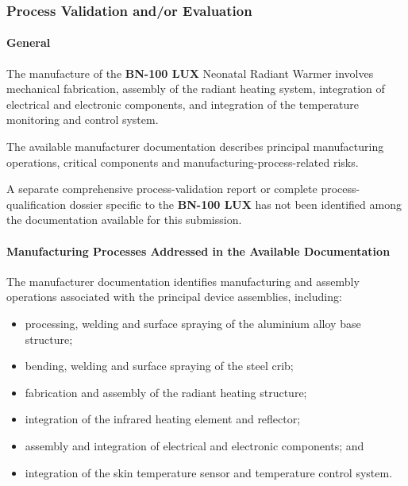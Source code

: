 ﻿

\hypertarget{p3-3-2-5}{}

\subsubsection{Process Validation and/or Evaluation}

\paragraph{General}

The manufacture of the \textbf{BN-100 LUX} Neonatal Radiant Warmer
involves mechanical fabrication, assembly of the radiant heating
system, integration of electrical and electronic components, and
integration of the temperature monitoring and control system.

The available manufacturer documentation describes principal
manufacturing operations, critical components and
manufacturing-process-related risks.

A separate comprehensive process-validation report or complete
process-qualification dossier specific to the \textbf{BN-100 LUX}
has not been identified among the documentation available for this
submission.


\paragraph{Manufacturing Processes Addressed in the Available Documentation}

The manufacturer documentation identifies manufacturing and
assembly operations associated with the principal device assemblies,
including:

\begin{itemize}
    \item processing, welding and surface spraying of the aluminium
    alloy base structure;
    \item bending, welding and surface spraying of the steel crib;
    \item fabrication and assembly of the radiant heating structure;
    \item integration of the infrared heating element and reflector;
    \item assembly and integration of electrical and electronic
    components; and
    \item integration of the skin temperature sensor and temperature
    control system.
\end{itemize}

